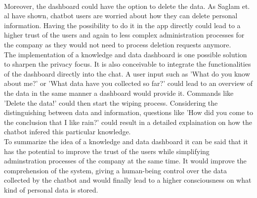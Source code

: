 \documentclass[sigconf, nonacm]{acmart}
\begin{document}
\\
Moreover, the dashboard could have the option to delete the data. As Saglam et. al \cite{Saglam2021} have shown, chatbot users are worried about how they can delete personal information. Having the possibility to do it in the app directly could lead to a higher trust of the users and again to less complex administration processes for the company
as they would not need to process deletion requests anymore.
\\
The implementation of a knowledge and data dashboard is one possible solution to sharpen the privacy focus. It is also conceivable to integrate the functionalities of the dashboard directly into the chat.
A user input such as 'What do you know about me?' or 'What data have you collected so far?' could lead to an overview of the data in the same manner a dashboard would provide it.
Commands like 'Delete the data!' could then start the wiping process. 
Considering the distinguishing between data and information, questions like 'How did you come to the conclusion that I like rain?' could result in a detailed explaination on how the chatbot infered this particular knowledge.
\\
To summarize the idea of a knowledge and data dashboard it can be said that it has the potential to improve the trust of the users while simplifying adminstration processes of the company at the same time. 
It would improve the comprehension of the system, giving a human-being control over the data collected by the chatbot and would finally lead to a higher consciousness on what kind of personal data is stored.
\end{document}
